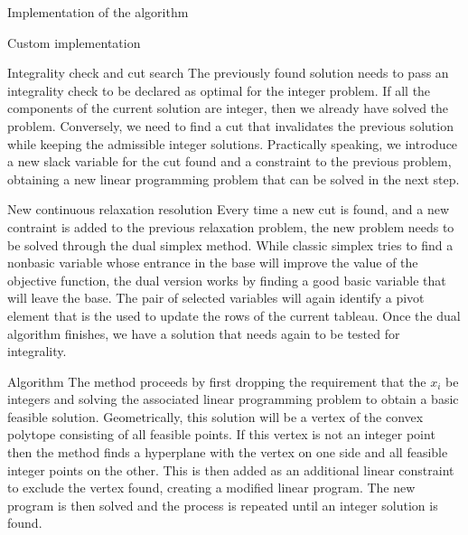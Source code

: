 \documentclass[9pt]{extarticle}
\begin{document}
\begin{section}{Implementation of the algorithm}
\begin{subsection}{Custom implementation}
            \begin{subsubsection}{Integrality check and cut search}
                The previously found solution needs to pass an integrality check to be declared as optimal for the integer problem.
                If all the components of the current solution are integer, then we already have solved the problem.
                Conversely, we need to find a cut that invalidates the previous solution while keeping the admissible integer solutions.
                Practically speaking, we introduce a new slack variable for the cut found and a constraint to the previous problem,
                obtaining a new linear programming problem that can be solved in the next step.
            \end{subsubsection}

            \begin{subsubsection}{New continuous relaxation resolution}
                Every time a new cut is found, and a new contraint is added to the previous relaxation problem, the new problem needs to be solved
                through the dual simplex method.
                While classic simplex tries to find a nonbasic variable whose entrance in the base will improve the value of the objective function,
                the dual version works by finding a good basic variable that will leave the base.
                The pair of selected variables will again identify a pivot element that is the used to update the rows of the current tableau.
                Once the dual algorithm finishes, we have a solution that needs again to be tested for integrality.
            \end{subsubsection}
        
        \end{subsection}
        
        \begin{subsection}{Algorithm}
            The method proceeds by first dropping the requirement that the $x_i$ be integers and solving the associated linear 
            programming problem to obtain a basic feasible solution. 
            Geometrically, this solution will be a vertex of the convex polytope consisting of all feasible points. 
            If this vertex is not an integer point then the method finds a hyperplane with the vertex on one side and all 
            feasible integer points on the other. 
            This is then added as an additional linear constraint to exclude the vertex found, creating a modified linear 
            program. 
            The new program is then solved and the process is repeated until an integer solution is found.
            \cite{wiki:cuttingplane}


\end{subsection}
\end{section}
\end{document}
